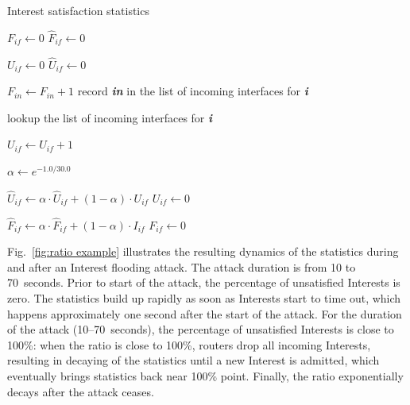 \documentclass[10pt,conference]{IEEEtran}
\begin{document}
\begin{algorithm}[t]
\footnotesize
\caption{\small Interest satisfaction statistics}
\label{algo:interest stats}
\begin{algorithmic}[1]

    \State $F_{if} \leftarrow 0$ 
    \State $\hat F_{if} \leftarrow 0$ 

    \State $U_{if} \leftarrow 0$ 
    \State $\hat U_{if} \leftarrow 0$ 
\EndFor

\vspace{0.1cm}
  \State $F_{in} \leftarrow F_{in} + 1$
  \State record \textbf{\emph{in}} in the list of incoming interfaces for \textbf{\emph{i}}
\EndFunction

\vspace{0.1cm}
    \State lookup the list of incoming interfaces for \textbf{\emph{i}}

        \State $U_{if} \leftarrow U_{if} + 1$
    \EndFor
\EndFunction

\vspace{0.1cm}

\State {} 
 
\State $\alpha \leftarrow e^{-1.0/30.0}$  %

    \State $\hat U_{if} \leftarrow \alpha \cdot \hat U_{if} + (1 - \alpha) \cdot U_{if}$ 
    \State $U_{if} \leftarrow 0$ 

     
        \State $\hat F_{if} \leftarrow \alpha \cdot \hat F_{if} + (1 - \alpha) \cdot I_{if}$ 
        \State $F_{if} \leftarrow 0$ 
    \EndIf
\EndFor

\EndFunction

\end{algorithmic}
\end{algorithm}


Fig.~\ref{fig:ratio example} illustrates the resulting dynamics of the statistics during and after an Interest flooding attack. The attack duration is from 10 to 70~seconds. Prior to start of the attack, the percentage of unsatisfied Interests is zero.  
The statistics build up rapidly as soon as Interests start to time out, which happens approximately one second after the start of the attack.
For the duration of the attack (10--70~seconds), the percentage of unsatisfied Interests is close to 100\%: 
when the ratio is close to 100\%, routers drop all incoming Interests, resulting in decaying of the statistics until a new Interest is admitted, which eventually brings statistics back near 100\% point.
Finally, the ratio exponentially decays after the attack ceases.
\end{document}
